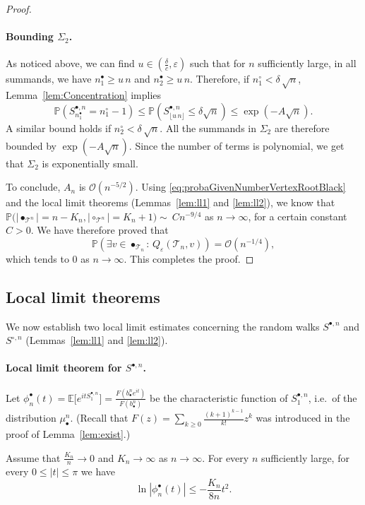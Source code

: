 \documentclass[10pt]{amsart}
\theoremstyle{definition}\newtheorem{defi}[theo]{Definition}\newtheorem{rema}[theo]{Remark}\newtheorem{exam}[theo]{Example}\newtheorem{exem}[theo]{Example}\newtheorem{nota}[theo]{Notation}
\providecommand{\abs}[1]{\lvert#1\rvert}
\def\eps{\varepsilon}
\def\bbn{b_{\bullet}^{n}}
\def\mubn{\mu_{\bullet}^{n}}
\def\Sbn{S^{\bullet,n}}
\def\Scn{S^{\circ,n}}
\def\phibn{\phi^{\bullet}_{n}}
\def\Ts{\mathscr{T}}
\newcommand\Esb[1]{\mathbb{E}\big[#1\big]}
\renewcommand\Pr[1]{\mathbb{P}\left(#1\right)}
\newcommand\Prb[1]{\mathbb{P}\big(#1\big)}
\begin{document}
\begin{proof}
\paragraph*{Bounding  $\varSigma_2$.}
  As noticed above, we can find  $u \in (\tfrac{\delta}{c},\eps)$  such that for $n$ sufficiently large, in all summands, we have $n_1^\bullet \ge u\, n$ and $n_2^\bullet \ge u\, n$.
  Therefore, if $n_1^\circ < \delta\, \sqrt{n}$, Lemma~\ref{lem:Concentration} implies
  \[\Pr{\Sbn_{n^\bullet_1}=n^\circ_1-1} \le
  \Pr{\Sbn_{\lfloor u\, n \rfloor} \le \delta \sqrt{n}} \le \exp(-A \sqrt{n}).\]
  A similar bound holds if $n_2^\circ < \delta\, \sqrt{n}$.
  All the summands in $\varSigma_2$ are therefore bounded by $\exp(-A \sqrt{n})$.
  Since the number of terms is polynomial, we get that
  $\varSigma_2$ is exponentially small.


  To conclude, $A_{n}$ is $\mathcal O(n^{-5/2})$.
  Using \eqref{eq:probaGivenNumberVertexRootBlack} and the local limit theorems (Lemmas~\ref{lem:ll1} and \ref{lem:ll2}),
  we know that $\Prb{\abs{\bullet_{\Ts^{n}}}=n-K_n, \abs{\circ_{\Ts^{n}}} =K_n+1} \sim\ C n^{-9/4}$ as $n \rightarrow \infty$, for a certain constant $C>0$.
  We have therefore proved that
  \[  \Pr{\exists v \in \bullet_{\Ts_{n}}: \, Q_\eps(\Ts_{n},v)}= \mathcal O(n^{-1/4}),\]
  which tends to $0$ as $n \rightarrow \infty$.  This completes the proof.
\end{proof}



\subsection{Local limit theorems}
\label{ss:llt}

We now establish two local limit estimates concerning the random walks $\Sbn$ and $\Scn$
(Lemmas~\ref{lem:ll1} and \ref{lem:ll2}).



\paragraph*{Local limit theorem for $\Sbn$.}


Let $\phibn(t)=\Esb{e^{it\Sbn_{1}}}= \tfrac{F( \bbn e^{it})}{F(\bbn)}$  be the characteristic function of $\Sbn_{1}$,
i.e.\ of the distribution $\mubn$.
(Recall that $F(z)=\sum_{k \ge 0} \tfrac{(k+1)^{k-1}}{k!} z^k$ was introduced in the proof of Lemma~\ref{lem:exist}.)

\begin{lemma}\label{lem:phib}
Assume that $\tfrac{K_{n}}{n} \rightarrow 0$ and $K_{n} \rightarrow \infty$ as $n \rightarrow \infty$. For every $n$ sufficiently large, for every $ 0 \leq |t| \leq \pi$  we have
\begin{equation}
\label{eq:phib}  \ln | \phibn (t)| \leq -  \frac{K_{n}}{ 8n} t^{2}.
\end{equation}
\end{lemma}
\end{document}
